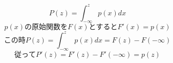 $$P(z)=\int_{-\infty}^{z}{p(x)dx}$$
$$p(x)の原始関数をF(x)とするとF'(x)=p(x)$$
$$この時P(z)=\int_{-\infty}^{z}{p(x)dx}=F(z)-F(-\infty)$$
$$従ってP'(z)=F'(z)-F'(-\infty)=p(z)$$
